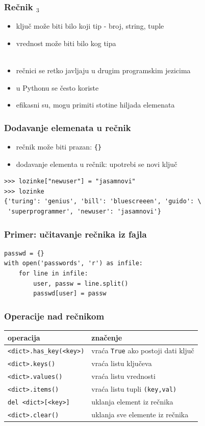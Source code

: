 \documentclass[compress]{beamer}
\begin{document}
\begin{frame}[fragile]
  \frametitle{Rečnik $_3$}
  \begin{itemize}
    \item ključ može biti bilo koji  tip - broj, string, tuple
    \item vrednost može biti bilo kog tipa \\ \ \\
    \item rečnici se retko javljaju u drugim programskim jezicima
    \item u Pythonu se često koriste
    \item efikasni su, mogu primiti stotine hiljada elemenata
  \end{itemize}
\end{frame}

\begin{frame}[fragile]
  \frametitle{Dodavanje elemenata u rečnik}
  \begin{itemize}
    \item rečnik može biti prazan: \texttt{\{\}}
    \item dodavanje elementa u rečnik: upotrebi se novi ključ
  \end{itemize}
\begin{verbatim}
>>> lozinke["newuser"] = "jasamnovi"
>>> lozinke
{'turing': 'genius', 'bill': 'bluescreeen', 'guido': \
 'superprogrammer', 'newuser': 'jasamnovi'}
\end{verbatim}
\end{frame}

\begin{frame}[fragile]
  \frametitle{Primer: učitavanje rečnika iz fajla}
\begin{verbatim}
passwd = {}
with open('passwords', 'r') as infile:
    for line in infile:
        user, passw = line.split()
        passwd[user] = passw
\end{verbatim}
\end{frame}

\begin{frame}[fragile]
  \frametitle{Operacije nad rečnikom}
\begin{center}
\begin{tabular}{l|l}
\textbf{operacija} & \textbf{značenje} \\ \hline
\texttt{<dict>.has\_key(<key>)} & vraća \texttt{True} ako postoji dati ključ \\
\texttt{<dict>.keys()} & vraća listu ključeva \\
\texttt{<dict>.values()} & vraća listu vrednosti \\
\texttt{<dict>.items()} & vraća listu tupli \texttt{(key,val)} \\
\texttt{del <dict>[<key>]} & uklanja element iz rečnika \\
\texttt{<dict>.clear()} & uklanja sve elemente iz rečnika
\end{tabular}
\end{center}
\end{frame}
\end{document}
